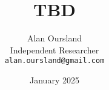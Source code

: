 \documentclass[10pt]{article}
\begin{document}
\title{TBD}
\author{Alan Oursland\\
Independent Researcher\\
\texttt{alan.oursland@gmail.com}}
\date{January 2025}

\maketitle

\begin{abstract}
    
\end{abstract}
    
\begin{multicols}{2}  %












\end{multicols}
\end{document}

